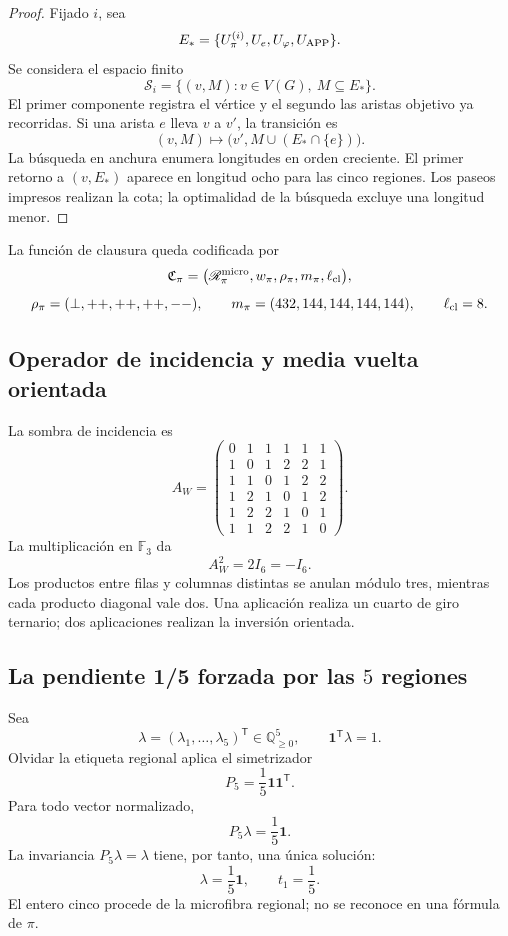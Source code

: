 \begin{proof}
Fijado \(i\), sea
\[
 E_*=\{U_\pi^{(i)},U_e,U_\varphi,U_{\rm APP}\}.
\]
Se considera el espacio finito
\[
 \mathscr S_i=\{(v,M):v\in V(G),\ M\subseteq E_*\}.
\]
El primer componente registra el vértice y el segundo las aristas objetivo
ya recorridas. Si una arista \(e\) lleva \(v\) a \(v'\), la transición es
\[
 (v,M)\longmapsto
 \bigl(v',M\cup(E_*\cap\{e\})\bigr).
\]
La búsqueda en anchura enumera longitudes en orden creciente. El primer
retorno a \((v,E_*)\) aparece en longitud ocho para las cinco regiones.
Los paseos impresos realizan la cota; la optimalidad de la búsqueda excluye
una longitud menor.
\end{proof}

La función de clausura queda codificada por
\[
 \mathfrak C_\pi=
 \bigl(\mathscr R_\pi^{\rm micro},
 w_\pi,\rho_\pi,m_\pi,\ell_{\rm cl}\bigr),
\]
\[
 \rho_\pi=(\perp,++ ,++ ,++ ,--),
 \qquad
 m_\pi=(432,144,144,144,144),
 \qquad
 \ell_{\rm cl}=8.
\]

\subsection{Operador de incidencia y media vuelta orientada}

La sombra de incidencia es
\[
 A_W=
 \begin{pmatrix}
 0&1&1&1&1&1\\
 1&0&1&2&2&1\\
 1&1&0&1&2&2\\
 1&2&1&0&1&2\\
 1&2&2&1&0&1\\
 1&1&2&2&1&0
 \end{pmatrix}.
\]
La multiplicación en \(\mathbb F_3\) da
\begin{equation}
 \boxed{A_W^2=2I_6=-I_6.}
 \label{p12-83-c8-s1:eq:aw-cuadrado-menos-identidad-pi}
\end{equation}
Los productos entre filas y columnas distintas se anulan módulo tres,
mientras cada producto diagonal vale dos. Una aplicación realiza un cuarto
de giro ternario; dos aplicaciones realizan la inversión orientada.

\subsection{La pendiente 1/5 forzada por las \(5\) regiones}

Sea
\[
 \lambda=(\lambda_1,\ldots,\lambda_5)^{\mathsf T}
 \in\mathbb Q_{\geq0}^5,
 \qquad
 \mathbf1^{\mathsf T}\lambda=1.
\]
Olvidar la etiqueta regional aplica el simetrizador
\[
 P_5=\frac15\mathbf1\mathbf1^{\mathsf T}.
\]
Para todo vector normalizado,
\[
 P_5\lambda=\frac15\mathbf1.
\]
La invariancia \(P_5\lambda=\lambda\) tiene, por tanto, una única solución:
\begin{equation}
 \boxed{\lambda=\frac15\mathbf1,\qquad t_1=\frac15.}
 \label{p12-83-c8-s1:eq:pendiente-primitiva-pi}
\end{equation}
El entero cinco procede de la microfibra regional; no se reconoce en una
fórmula de \(\pi\).


